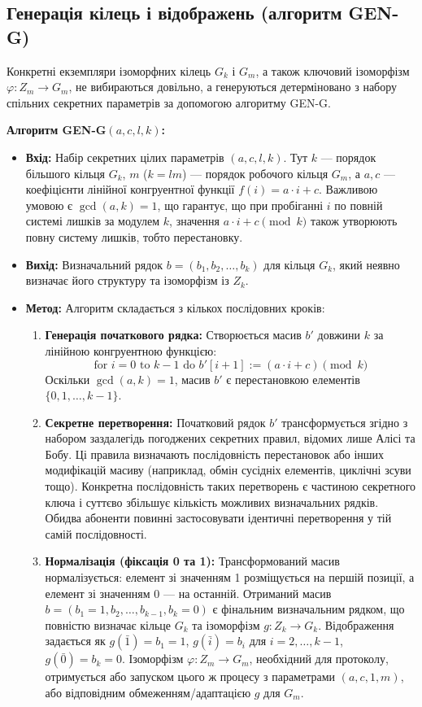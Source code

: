 \subsection{Генерація кілець і відображень (алгоритм GEN-G)}
\label{subsec:gen_g_algorithm}
Конкретні екземпляри ізоморфних кілець $G_k$ і $G_m$, а також ключовий ізоморфізм $\varphi: Z_m \to G_m$, не вибираються довільно, а генеруються детерміновано з набору спільних секретних параметрів за допомогою алгоритму GEN-G.

\textbf{Алгоритм GEN-G$(a,c,l,k)$:}
\begin{itemize}
    \item \textbf{Вхід:} Набір секретних цілих параметрів $(a, c, l, k)$. Тут $k$ — порядок більшого кільця $G_k$, $m$ ($k=lm$) — порядок робочого кільця $G_m$, а $a, c$ — коефіцієнти лінійної конгруентної функції $f(i) = a \cdot i + c$. Важливою умовою є $\gcd(a, k) = 1$, що гарантує, що при пробіганні $i$ по повній системі лишків за модулем $k$, значення $a \cdot i + c \pmod{k}$ також утворюють повну систему лишків, тобто перестановку.
    \item \textbf{Вихід:} Визначальний рядок $b = (b_1, b_2, \ldots, b_k)$ для кільця $G_k$, який неявно визначає його структуру та ізоморфізм із $Z_k$.
    \item \textbf{Метод:} Алгоритм складається з кількох послідовних кроків:
    \begin{enumerate}
        \item \textbf{Генерація початкового рядка:} Створюється масив $b'$ довжини $k$ за лінійною конгруентною функцією:
        \[
            \text{for } i = 0 \text{ to } k-1 \text{ do } b'[i+1] := (a \cdot i + c) \pmod{k}
        \]
        Оскільки $\gcd(a,k)=1$, масив $b'$ є перестановкою елементів $\{0, 1, \ldots, k-1\}$.
        \item \textbf{Секретне перетворення:} Початковий рядок $b'$ трансформується згідно з набором заздалегідь погоджених секретних правил, відомих лише Алісі та Бобу. Ці правила визначають послідовність перестановок або інших модифікацій масиву (наприклад, обмін сусідніх елементів, циклічні зсуви тощо). Конкретна послідовність таких перетворень є частиною секретного ключа і суттєво збільшує кількість можливих визначальних рядків. Обидва абоненти повинні застосовувати ідентичні перетворення у тій самій послідовності.
        \item \textbf{Нормалізація (фіксація 0 та 1):} Трансформований масив нормалізується: елемент зі значенням 1 розміщується на першій позиції, а елемент зі значенням 0 — на останній. Отриманий масив $b = (b_1=1, b_2, \ldots, b_{k-1}, b_k=0)$ є фінальним визначальним рядком, що повністю визначає кільце $G_k$ та ізоморфізм $g: Z_k \to G_k$. Відображення задається як $g(\bar{1}) = b_1 = 1$, $g(\bar{i}) = b_i$ для $i=2, \ldots, k-1$, $g(\bar{0}) = b_k = 0$. Ізоморфізм $\varphi: Z_m \to G_m$, необхідний для протоколу, отримується або запуском цього ж процесу з параметрами $(a, c, 1, m)$, або відповідним обмеженням/адаптацією $g$ для $G_m$.

\end{enumerate}
\end{itemize}
